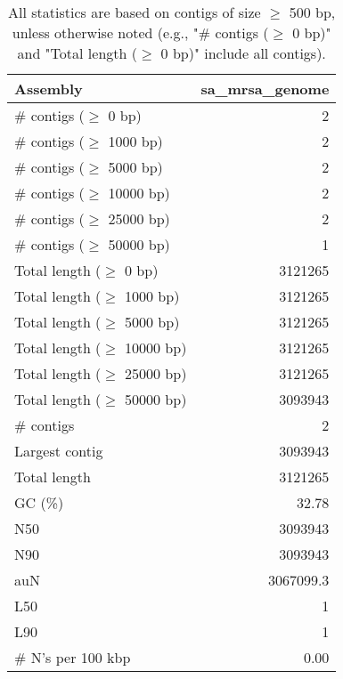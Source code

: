 \documentclass[12pt,a4paper]{article}
\begin{document}
\begin{table}[ht]
\begin{center}
\caption{All statistics are based on contigs of size $\geq$ 500 bp, unless otherwise noted (e.g., "\# contigs ($\geq$ 0 bp)" and "Total length ($\geq$ 0 bp)" include all contigs).}
\begin{tabular}{|l*{1}{|r}|}
\hline
Assembly & sa\_mrsa\_genome \\ \hline
\# contigs ($\geq$ 0 bp) & 2 \\ \hline
\# contigs ($\geq$ 1000 bp) & 2 \\ \hline
\# contigs ($\geq$ 5000 bp) & 2 \\ \hline
\# contigs ($\geq$ 10000 bp) & 2 \\ \hline
\# contigs ($\geq$ 25000 bp) & 2 \\ \hline
\# contigs ($\geq$ 50000 bp) & 1 \\ \hline
Total length ($\geq$ 0 bp) & 3121265 \\ \hline
Total length ($\geq$ 1000 bp) & 3121265 \\ \hline
Total length ($\geq$ 5000 bp) & 3121265 \\ \hline
Total length ($\geq$ 10000 bp) & 3121265 \\ \hline
Total length ($\geq$ 25000 bp) & 3121265 \\ \hline
Total length ($\geq$ 50000 bp) & 3093943 \\ \hline
\# contigs & 2 \\ \hline
Largest contig & 3093943 \\ \hline
Total length & 3121265 \\ \hline
GC (\%) & 32.78 \\ \hline
N50 & 3093943 \\ \hline
N90 & 3093943 \\ \hline
auN & 3067099.3 \\ \hline
L50 & 1 \\ \hline
L90 & 1 \\ \hline
\# N's per 100 kbp & 0.00 \\ \hline
\end{tabular}
\end{center}
\end{table}
\end{document}
